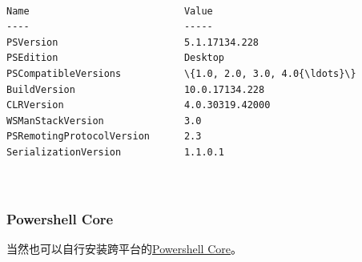 \documentclass[11pt]{ctexart}
\newenvironment{Shaded}{}{}
\newcommand{\FunctionTok}[1]{\textcolor[rgb]{0.02,0.16,0.49}{{#1}}}
\newcommand{\NormalTok}[1]{{#1}}
\newcommand{\VariableTok}[1]{\textcolor[rgb]{0.10,0.09,0.49}{{#1}}}
\begin{document}
    \begin{Verbatim}[commandchars=\\\{\}]

Name                           Value                                                                                   
----                           -----                                                                                   
PSVersion                      5.1.17134.228                                                                           
PSEdition                      Desktop                                                                                 
PSCompatibleVersions           \{1.0, 2.0, 3.0, 4.0{\ldots}\}                                                                 
BuildVersion                   10.0.17134.228                                                                          
CLRVersion                     4.0.30319.42000                                                                         
WSManStackVersion              3.0                                                                                     
PSRemotingProtocolVersion      2.3                                                                                     
SerializationVersion           1.1.0.1                                                                                 



    \end{Verbatim}

    \hypertarget{powershell-core}{%
\subsubsection{Powershell Core}\label{powershell-core}}

当然也可以自行安装跨平台的\href{https://github.com/PowerShell/PowerShell/releases}{Powershell
Core}。

\begin{Shaded}

\end{Shaded}
\end{document}

